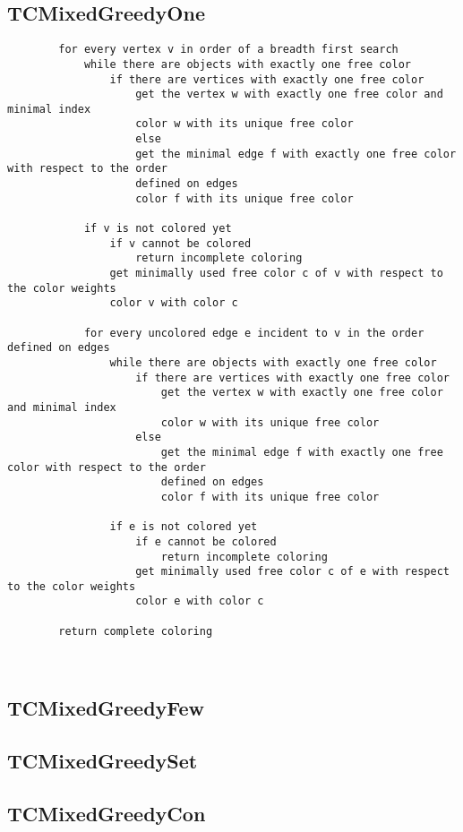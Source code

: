 \documentclass{article}
\begin{document}
	\subsection{TCMixedGreedyOne}
	\begin{verbatim}
		for every vertex v in order of a breadth first search
		    while there are objects with exactly one free color
		        if there are vertices with exactly one free color
		            get the vertex w with exactly one free color and minimal index
		            color w with its unique free color
			        else
		            get the minimal edge f with exactly one free color with respect to the order
		            defined on edges
		            color f with its unique free color
		
		    if v is not colored yet
		        if v cannot be colored
		            return incomplete coloring
		        get minimally used free color c of v with respect to the color weights
		        color v with color c
			    
		    for every uncolored edge e incident to v in the order defined on edges
		        while there are objects with exactly one free color
		            if there are vertices with exactly one free color
		                get the vertex w with exactly one free color and minimal index
		                color w with its unique free color
		            else
		                get the minimal edge f with exactly one free color with respect to the order 
		                defined on edges
		                color f with its unique free color
				    
		        if e is not colored yet
		            if e cannot be colored
		                return incomplete coloring
		            get minimally used free color c of e with respect to the color weights
		            color e with color c
				        
		return complete coloring
	\end{verbatim}
	
	~\newpage
	
	\subsection{TCMixedGreedyFew}
	\subsection{TCMixedGreedySet}
	\subsection{TCMixedGreedyCon}
\end{document}
